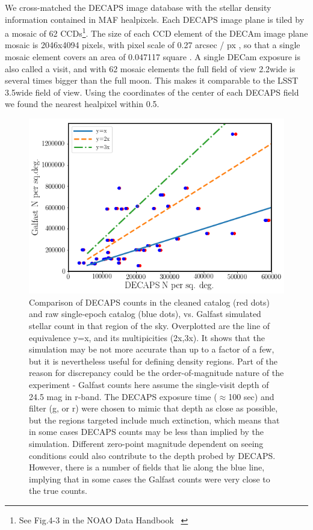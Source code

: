 \documentclass[DM,lsstdraft,toc,usenatbib]{lsstdoc}
\begin{document}
We cross-matched the DECAPS image database with the  stellar density information contained in MAF healpixels. Each DECAPS image plane is tiled by a mosaic of 62 CCDs\footnote{See Fig.4-3 in the NOAO Data Handbook ~\citep{shaw2015}}. The size of each CCD element of the DECAm image plane mosaic is 2046x4094 pixels, with pixel scale of 0.27 arcsec / px , so that a single mosaic element covers an area of 0.047117 square \degree. A single DECam exposure is also called a visit, and with 62 mosaic elements the full field of view  2.2\degree wide is several times bigger than the full moon. This makes it comparable to the LSST 3.5\degree wide field of view.  Using the coordinates of the center of each DECAPS field  we found the nearest healpixel within 0.5\degree . 


\begin{figure}
\centering
\includegraphics[width=0.75\columnwidth]{figs/MAF_DECAPS_comparison.png}
\caption{Comparison of DECAPS counts in the cleaned catalog (red dots) and raw single-epoch catalog (blue dots), vs. Galfast simulated stellar count in that region of the sky.  Overplotted are the line of equivalence y=x, and its multipicities (2x,3x). It shows that the simulation may be not more accurate than up to a factor of a few, but it is nevertheless useful for defining density regions. Part of the reason for discrepancy could be the order-of-magnitude nature of the experiment - Galfast counts here assume the single-visit depth of 24.5 mag in r-band. The DECAPS exposure time ($\approx$100 sec) and filter (g, or r) were chosen to mimic that depth as close as possible, but the regions targeted include much extinction, which means that in some cases DECAPS counts may be less than implied by the simulation. Different zero-point magnitude dependent on seeing conditions could also contribute to the depth probed by DECAPS.  However, there is a number of fields that lie along the blue line, implying that in some cases the Galfast counts were very close to the true counts.}
\label{fig:maf_decaps_compare}
\end{figure} 
\end{document}
